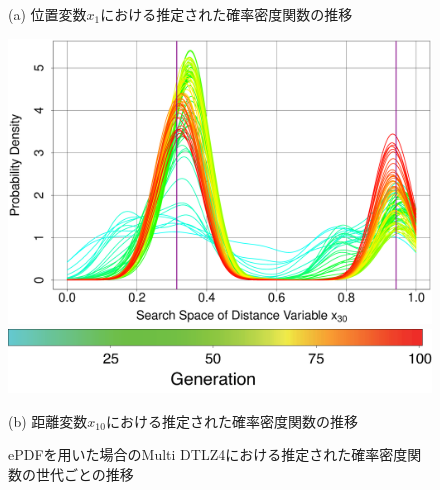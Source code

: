 \documentclass[../main/main]{subfiles}
\begin{document}
\begin{figure}[!h]
\begin{minipage}{0.61\hsize}
\begin{minipage}{0.49\hsize}
\begin{center}
{\footnotesize (a) 位置変数$x_1$における推定された確率密度関数の推移}
\end{center}
\end{minipage}
\begin{minipage}{0.49\hsize}
\includegraphics[width=1\linewidth]{../figures/multi_DTLZ4_var30_pdf_trend.eps}\\
\centering
\hspace{0.2in} \includegraphics[width=0.8\linewidth]{../figures/color_bar_100ver.eps}
\begin{center}
{\footnotesize (b) 距離変数$x_{10}$における推定された確率密度関数の推移}
\end{center}
\end{minipage}
\caption{ePDFを用いた場合のMulti DTLZ4における推定された確率密度関数の世代ごとの推移}
\label{pdf_trans_multidtlz4}
\end{minipage}
\label{fig:nondom_sol}
\end{figure}

\clearpage
\end{document}
